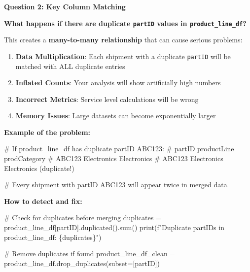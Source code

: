 \documentclass[
  letterpaper,
  DIV=11,
  numbers=noendperiod]{scrartcl}
\newenvironment{Shaded}{\begin{snugshade}}{\end{snugshade}}
\newcommand{\BuiltInTok}[1]{\textcolor[rgb]{0.00,0.23,0.31}{#1}}
\newcommand{\CommentTok}[1]{\textcolor[rgb]{0.37,0.37,0.37}{#1}}
\newcommand{\NormalTok}[1]{\textcolor[rgb]{0.00,0.23,0.31}{#1}}
\newcommand{\OperatorTok}[1]{\textcolor[rgb]{0.37,0.37,0.37}{#1}}
\newcommand{\SpecialCharTok}[1]{\textcolor[rgb]{0.37,0.37,0.37}{#1}}
\newcommand{\SpecialStringTok}[1]{\textcolor[rgb]{0.13,0.47,0.30}{#1}}
\newcommand{\StringTok}[1]{\textcolor[rgb]{0.13,0.47,0.30}{#1}}
\providecommand{\tightlist}{%
  \setlength{\itemsep}{0pt}\setlength{\parskip}{0pt}}
\begin{document}
\textbf{Question 2: Key Column Matching}

\textbf{What happens if there are duplicate \texttt{partID} values in
\texttt{product\_line\_df}?}

This creates a \textbf{many-to-many relationship} that can cause serious
problems:

\begin{enumerate}
\def\labelenumi{\arabic{enumi}.}
\tightlist
\item
  \textbf{Data Multiplication}: Each shipment with a duplicate
  \texttt{partID} will be matched with ALL duplicate entries
\item
  \textbf{Inflated Counts}: Your analysis will show artificially high
  numbers
\item
  \textbf{Incorrect Metrics}: Service level calculations will be wrong
\item
  \textbf{Memory Issues}: Large datasets can become exponentially larger
\end{enumerate}

\textbf{Example of the problem:}

\begin{Shaded}
\begin{Highlighting}[]
\CommentTok{\# If product\_line\_df has duplicate partID \textquotesingle{}ABC123\textquotesingle{}:}
\CommentTok{\# partID    productLine    prodCategory}
\CommentTok{\# ABC123   Electronics    Electronics  }
\CommentTok{\# ABC123   Electronics    Electronics  (duplicate!)}

\CommentTok{\# Every shipment with partID \textquotesingle{}ABC123\textquotesingle{} will appear twice in merged data}
\end{Highlighting}
\end{Shaded}

\textbf{How to detect and fix:}

\begin{Shaded}
\begin{Highlighting}[]
\CommentTok{\# Check for duplicates before merging}
\NormalTok{duplicates }\OperatorTok{=}\NormalTok{ product\_line\_df[}\StringTok{\textquotesingle{}partID\textquotesingle{}}\NormalTok{].duplicated().}\BuiltInTok{sum}\NormalTok{()}
\BuiltInTok{print}\NormalTok{(}\SpecialStringTok{f"Duplicate partIDs in product\_line\_df: }\SpecialCharTok{\{}\NormalTok{duplicates}\SpecialCharTok{\}}\SpecialStringTok{"}\NormalTok{)}

\CommentTok{\# Remove duplicates if found}
\NormalTok{product\_line\_df\_clean }\OperatorTok{=}\NormalTok{ product\_line\_df.drop\_duplicates(subset}\OperatorTok{=}\NormalTok{[}\StringTok{\textquotesingle{}partID\textquotesingle{}}\NormalTok{])}
\end{Highlighting}
\end{Shaded}
\end{document}
